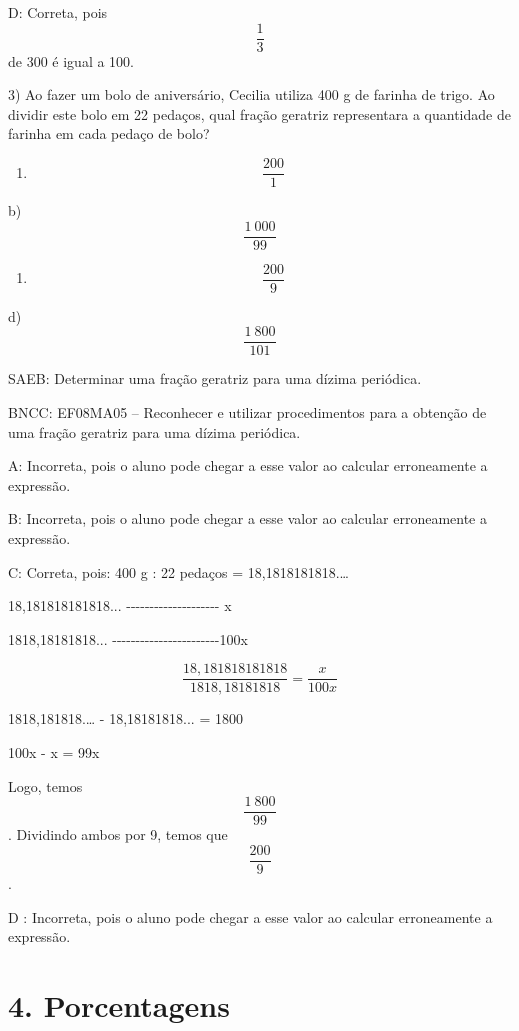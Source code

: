 D: Correta, pois \[\frac {1}{3}\] de 300 é igual a 100.

3) Ao fazer um bolo de aniversário, Cecilia utiliza 400 g de farinha de
trigo. Ao dividir este bolo em 22 pedaços, qual fração geratriz
representara a quantidade de farinha em cada pedaço de bolo?

\begin{enumerate}
\def\labelenumi{\alph{enumi})}
\tightlist
\item
  \[\ \frac{200}{1}\]
\end{enumerate}

b) \[\frac{1\ 000}{99}\]

\begin{enumerate}
\def\labelenumi{\alph{enumi})}
\setcounter{enumi}{2}
\tightlist
\item
  \[\ \frac{200}{9}\]
\end{enumerate}

d) \[\frac{1\ 800}{101}\]

SAEB: Determinar uma fração geratriz para uma dízima periódica.

BNCC: EF08MA05 -- Reconhecer e utilizar procedimentos para a obtenção de
uma fração geratriz para uma dízima periódica.

A: Incorreta, pois o aluno pode chegar a esse valor ao calcular
erroneamente a expressão.

B: Incorreta, pois o aluno pode chegar a esse valor ao calcular
erroneamente a expressão.

C: Correta, pois: 400 g : 22 pedaços = 18,1818181818.\ldots{}

18,181818181818...
-\/-\/-\/-\/-\/-\/-\/-\/-\/-\/-\/-\/-\/-\/-\/-\/-\/-\/-\/- x

1818,18181818...
-\/-\/-\/-\/-\/-\/-\/-\/-\/-\/-\/-\/-\/-\/-\/-\/-\/-\/-\/-\/-\/-\/-100x

\[\frac {18,181818181818}{1818,18181818} = \frac {x}{100x}\]

1818,181818.\ldots{} - 18,18181818... = 1800

100x - x = 99x

Logo, temos \[\frac{1\ 800}{99}\]. Dividindo ambos por 9, temos que
\[\frac{200}{9}\].

D : Incorreta, pois o aluno pode chegar a esse valor ao calcular
erroneamente a expressão.


\section{4. Porcentagens}

